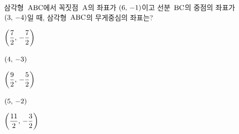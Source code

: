 삼각형~$\mathrm{ABC}$에서 꼭짓점~$\mathrm{A}$의 좌표가 $(6,\mkern3mu -1)$이고 선분~$\mathrm{BC}$의 중점의 좌표가 $(3,\mkern3mu -4)$일 때, 삼각형~$\mathrm{ABC}$의 무게중심의 좌표는?
\begin{choices32}{\rule[-3ex]{0pt}{8ex}$\left(\dfrac{7}{2},\mkern3mu -\dfrac{7}{2}\right)$}{\rule[-3ex]{0pt}{8ex}$(4,\mkern3mu -3)$}{\rule[-3ex]{0pt}{8ex}$\left(\dfrac{9}{2},\mkern3mu -\dfrac{5}{2}\right)$}{\rule[-3ex]{0pt}{8ex}$(5,\mkern3mu -2)$}{\rule[-3ex]{0pt}{8ex}$\left(\dfrac{11}{2},\mkern3mu -\dfrac{3}{2}\right)$}\end{choices32}

